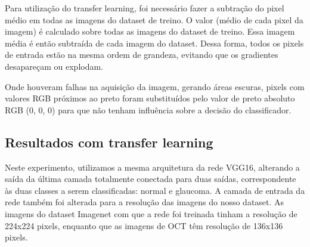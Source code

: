 \documentclass[conference]{IEEEtran}
\begin{document}

  
  
  Para utilização do transfer learning, foi necessário fazer a subtração do pixel médio em todas as imagens do dataset de treino. O valor (médio de cada pixel da imagem) é calculado sobre todas as imagens do dataset de treino. Essa imagem média é então subtraída de cada imagem do dataset. Dessa forma, todos os pixels de entrada estão na mesma ordem de grandeza, evitando que os gradientes desapareçam ou explodam.

  Onde houveram falhas na aquisição da imagem, gerando áreas escuras, pixels com valores RGB próximos ao preto foram substituídos pelo valor de preto absoluto RGB (0, 0, 0) para que não tenham influência sobre a decisão do classificador.

  \subsection{Resultados com transfer learning}



  Neste experimento, utilizamos a mesma arquitetura da rede VGG16, alterando a saída da última camada totalmente conectada para duas saídas, correspondente às duas classes a serem classificadas: normal e glaucoma. A camada de entrada da rede também foi alterada para a resolução das imagens do nosso dataset. As imagens do dataset Imagenet com que a rede foi treinada tinham a resolução de 224x224 pixels, enquanto que as imagens de OCT têm resolução de 136x136 pixels.
  
\end{document}
